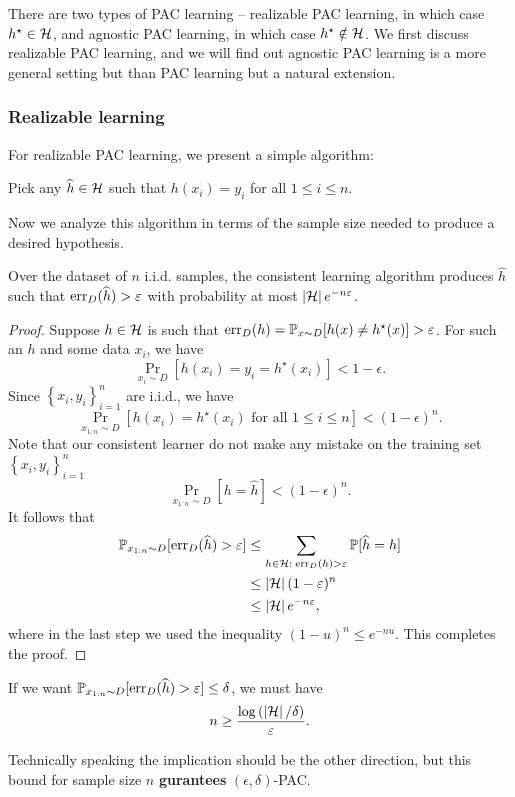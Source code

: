 \documentclass[a4paper]{article}
\begin{document}
There are two types of PAC learning -- realizable PAC learning,
in which case $h^\star \in \mathcal{H}$, and agnostic PAC learning,
in which case $h^\star \notin \mathcal{H}$. We first discuss
realizable PAC learning, and we will find out agnostic PAC
learning is a more general setting but than PAC learning
but a natural extension.

\subsubsection{Realizable learning}

For realizable PAC learning, we present a simple algorithm:
\begin{algorithm}
Pick any $\widehat{h} \in \mathcal{H}$ such that $h(x_i) = y_i$
for all $1 \leq i \leq n$.
\end{algorithm}
Now we analyze this algorithm in terms of the sample size needed
to produce a desired hypothesis.

\begin{thm}
  Over the dataset of $n$ i.i.d. samples,
  the consistent learning algorithm produces $\hat{h}$ such
  that $\operatorname{err}_D(\widehat{h}) > \varepsilon$ with probability
  at most $\left\lvert \mathcal{H}\right\rvert e^{-n\varepsilon}$.
\end{thm}
\begin{proof}
  Suppose $h \in \mathcal{H}$ is such that
  $\operatorname{err}_D(h) = \mathbb{P}_{x \sim D} [h(x) \neq h^\star(x)] > \varepsilon$.
  For such an $h$ and some data $x_i$, we have
  \[
  \Pr_{x_i \sim D} [h(x_i) = y_i = h^\star(x_i)] < 1 - \epsilon.
  \]
  Since $\left\{ x_i, y_i \right\}_{i=1}^n$ are i.i.d., we have
  \[
  \Pr_{x_{1:n} \sim D}[h(x_i) = h^\star(x_i) \text{ for all
  $1 \leq i \leq n$}] < (1 - \epsilon)^n.
  \]
  Note that our consistent learner do not make any mistake
  on the training set $\left\{ x_i, y_i \right\}_{i=1}^n$
  \[
  \Pr_{x_{1 : n} \sim D} [h = \hat{h}] < (1 - \epsilon)^n.
  \]
  It follows that
  \[
  \begin{aligned}
    \mathbb{P}_{x_{1 : n} \sim D} [\operatorname{err}_D (\widehat{h}) > \varepsilon]
    & \leq \sum_{h \in \mathcal{H}: \; \operatorname{err}_D(h) > \varepsilon}
    \mathbb{P}[\widehat{h} = h]  \\
    & \leq \left\lvert \mathcal{H}\right\rvert (1 - \varepsilon)^n \\
    & \leq \left\lvert \mathcal{H}\right\rvert e^{-n\varepsilon},
  \end{aligned}
  \]
  where in the last step we used the inequality
  $(1 - u)^n \leq e^{-nu}$. This completes the proof.
\end{proof}

\begin{cor}
  If we want $\mathbb{P}_{x_{1 : n} \sim D} [\operatorname{err}_D (\widehat{h}) > \varepsilon]
  \leq \delta$, we must have
  \[
  n \geq \frac{\log \left( \left\lvert \mathcal{H}\right\rvert / \delta \right)}{\varepsilon}.
  \]
\end{cor}
Technically speaking the implication should be the other direction,
but this bound for sample size $n$
\textbf{gurantees} $(\epsilon, \delta)$-PAC.
\end{document}
